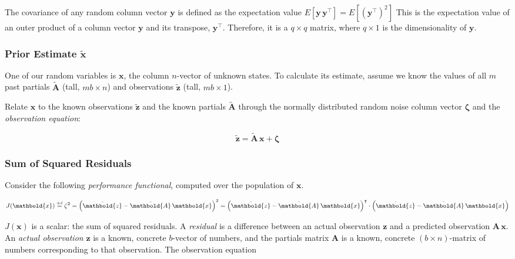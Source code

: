 \documentclass[10pt,oneside,x11names]{article}
\begin{document}
The covariance of any random column vector \(\mathbold{y}\) is defined as the
expectation value
\(E
\left[
\mathbold{y}\,
\mathbold{y}^\intercal
\right]
=
E
\left[
({\mathbold{y}^\intercal})^2
\right]\)
\noindent This is the expectation value of an outer product of a column vector
\(\mathbold{y}\) and its transpose, \(\mathbold{y}^\intercal\). Therefore, it is a
\(q\times{q}\) matrix, where \(q\times{1}\) is the dimensionality of \(\mathbold{y}\).

\subsubsection{Prior Estimate \({\tilde{\mathbold{x}}}\)}
\label{sec:orgheadline7}

One of our random variables is \(\mathbold{x}\), the column \mbox{$n$-vector} of unknown
states. To calculate its estimate, assume we know the values of all \(m\) past
partials \({\tilde{\mathbold{A}}}\) (tall, \(m b\times{n}\)) and observations
\(\tilde{\mathbold{z}}\) (tall, \(m b\times{1}\)).

Relate \(\mathbold{x}\) to the known observations \({\tilde{\mathbold{z}}}\) and the known
partials \({\tilde{\mathbold{A}}}\) through the normally distributed random noise column
vector \(\mathbold{\zeta}\) and the \emph{observation equation}:

\begin{equation}
\label{eqn:observation-equation}
{\tilde{\mathbold{z}}}={\tilde{\mathbold{A}}}\,\mathbold{x}+\mathbold{\zeta}
\end{equation}

\subsubsection{Sum of Squared Residuals}
\label{sec:orgheadline8}

Consider the
following \emph{performance functional}, computed over the population of
\(\mathbold{x}\).

\begin{equation*}
J(\mathbold{x})
\stackrel{\text{\tiny def}}{=}
\zeta^2=
\left(
{\tilde{\mathbold{z}}}-
{\tilde{\mathbold{A}}}\,
\mathbold{x}
\right)^2=
\left(
{\tilde{\mathbold{z}}}-
{\tilde{\mathbold{A}}}\,
\mathbold{x}
\right)^\intercal
\cdot
\left(
{\tilde{\mathbold{z}}}-
{\tilde{\mathbold{A}}}\,
\mathbold{x}
\right)
\end{equation*}

\noindent \(J(\mathbold{x})\) is a scalar: the sum of squared residuals. A
\emph{residual} is a difference between an actual observation \(\mathbold{z}\) and a
predicted observation \(\mathbold{A}\,\mathbold{x}\). An \emph{actual observation}
\(\mathbold{z}\) is a known,
concrete \mbox{$b$-vector} of numbers, and the partials matrix \(\mathbold{A}\)
is a known, concrete \mbox{$(b\times n)$-matrix} of numbers
corresponding to that observation. The observation equation
\end{document}
